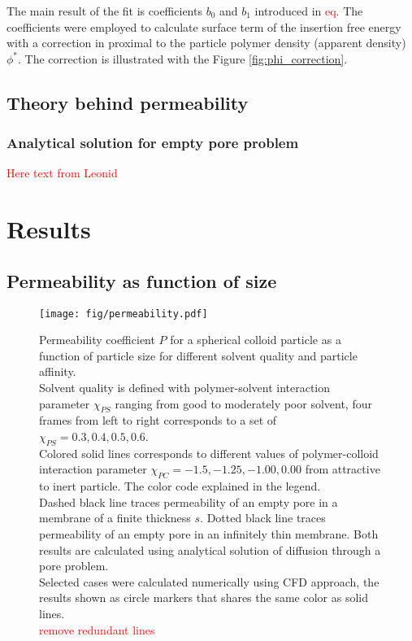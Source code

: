 \documentclass[12pt, a4paper]{article}
\newcommand\todo[1]{\textcolor{red}{#1}}
\begin{document}
The main result of the fit is coefficients $b_0$ and $b_1$ introduced in \todo{eq}.
The coefficients were employed to calculate surface term of the insertion free energy with a correction in proximal to the particle polymer density (apparent density) $\phi^{\ast}$.
The correction is illustrated with the Figure \ref{fig:phi_correction}.


\subsection{Theory behind permeability}
\subsubsection{Analytical solution for empty pore problem}
\todo{Here text from Leonid}


\section{Results}
\subsection{Permeability as function of size}

\begin{figure}
    \centering
    \texttt{[image: fig/permeability.pdf]}
    \caption{
        Permeability coefficient $P$ for a spherical colloid particle as a function of particle size for different solvent quality and particle affinity.
        \\
        Solvent quality is defined with polymer-solvent interaction parameter $\chi_{PS}$ ranging from good to moderately poor solvent, four frames from left to right corresponds to a set of $\chi_{PS} = {0.3, 0.4, 0.5, 0.6}$.
        \\
        Colored solid lines corresponds to different values of polymer-colloid interaction parameter $\chi_{PC} = {-1.5, -1.25, -1.00, 0.00}$ from attractive to inert particle. 
        The color code explained in the legend.
        \\
        Dashed black line traces permeability of an empty pore in a membrane of a finite thickness $s$.
        Dotted black line traces permeability of an empty pore in an infinitely thin membrane.
        Both results are calculated using analytical solution of diffusion through a pore problem.
        \\
        Selected cases were calculated numerically using CFD approach, the results shown as circle markers that shares the same color as solid lines.
        \\
        \todo{remove redundant lines}
        }
        \label{fig:partition_on_d}
\end{figure}
\end{document}

